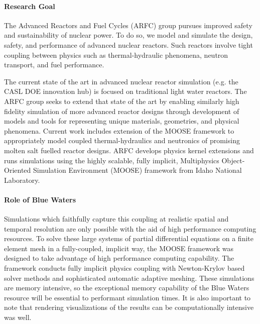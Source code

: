 \documentclass[11pt]{article}
\newcommand{\authorname}{Kathryn~D.~Huff }
\newcommand{\authorsite}{arfc.npre.illinois.edu}
\begin{document}
\pagestyle{fancy}
\lhead{\textcolor{gray}{Investigator: Prof. \authorname\\Presenter: Dr. Alexander Lindsay}}
\rhead{\textcolor{gray}{Advanced Reactors and Fuel Cycles\\}}
\renewcommand{\headrulewidth}{0pt}
\renewcommand{\footrulewidth}{0pt}
\fancyfoot[C]{\footnotesize \textcolor{gray}{\authorsite}}

\paragraph{Research Goal}

The Advanced Reactors and Fuel Cycles (ARFC) group pursues improved safety and
sustainability of nuclear power. To do so, we model and
simulate the design, safety, and performance of advanced nuclear reactors.
Such reactors  involve tight coupling between physics such as thermal-hydraulic
phenomena, neutron transport, and fuel performance.

The current state of the art in advanced nuclear reactor simulation (e.g. the
CASL DOE innovation hub) is focused on traditional light water reactors.
The ARFC group seeks to extend that state of the art by enabling similarly high fidelity simulation of more advanced reactor designs through development of models and tools for representing unique materials, geometries, and physical phenomena. Current work includes extension
of the MOOSE framework to appropriately model coupled thermal-hydraulics and
neutronics of promising molten salt fuelled reactor designs.
ARFC develops physics kernel extensions and runs simulations using the highly
scalable, fully implicit, Multiphysics Object-Oriented Simulation Environment
(MOOSE) framework from Idaho National Laboratory.


\paragraph{Role of Blue Waters}
Simulations which faithfully capture this coupling at realistic spatial and
temporal resolution are only possible with the aid of high performance
computing resources.  To solve these large systems of partial differential
equations on a finite element mesh in a fully-coupled, implicit way, the MOOSE
framework was designed to take advantage of high performance computing
capability.  The framework conducts fully implicit physics coupling with
Newton-Krylov based solver methods and sophisticated automatic
adaptive meshing.  These simulations are memory intensive, so the exceptional
memory capability of the Blue Waters resource will be essential to performant
simulation times. It is also important to note that rendering visualizations of
the results can be computationally intensive was well.
\end{document}
